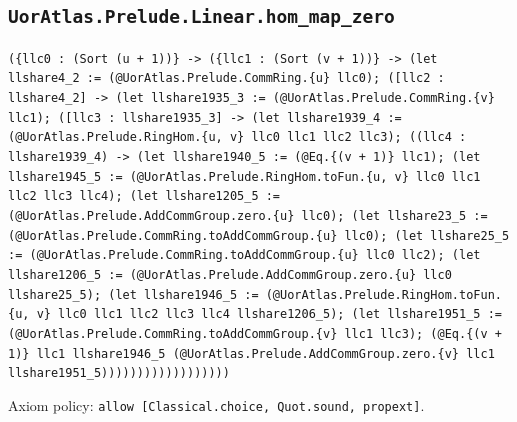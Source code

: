 \documentclass[11pt]{article}
\begin{document}
\subsection*{\texttt{UorAtlas.Prelude.Linear.hom\_map\_zero}}
\noindent\texttt{(\{llc0 : (Sort (u + 1))\} -> (\{llc1 : (Sort (v + 1))\} -> (let llshare4\_2 := (@UorAtlas.Prelude.CommRing.\{u\} llc0); ([llc2 : llshare4\_2] -> (let llshare1935\_3 := (@UorAtlas.Prelude.CommRing.\{v\} llc1); ([llc3 : llshare1935\_3] -> (let llshare1939\_4 := (@UorAtlas.Prelude.RingHom.\{u, v\} llc0 llc1 llc2 llc3); ((llc4 : llshare1939\_4) -> (let llshare1940\_5 := (@Eq.\{(v + 1)\} llc1); (let llshare1945\_5 := (@UorAtlas.Prelude.RingHom.toFun.\{u, v\} llc0 llc1 llc2 llc3 llc4); (let llshare1205\_5 := (@UorAtlas.Prelude.AddCommGroup.zero.\{u\} llc0); (let llshare23\_5 := (@UorAtlas.Prelude.CommRing.toAddCommGroup.\{u\} llc0); (let llshare25\_5 := (@UorAtlas.Prelude.CommRing.toAddCommGroup.\{u\} llc0 llc2); (let llshare1206\_5 := (@UorAtlas.Prelude.AddCommGroup.zero.\{u\} llc0 llshare25\_5); (let llshare1946\_5 := (@UorAtlas.Prelude.RingHom.toFun.\{u, v\} llc0 llc1 llc2 llc3 llc4 llshare1206\_5); (let llshare1951\_5 := (@UorAtlas.Prelude.CommRing.toAddCommGroup.\{v\} llc1 llc3); (@Eq.\{(v + 1)\} llc1 llshare1946\_5 (@UorAtlas.Prelude.AddCommGroup.zero.\{v\} llc1 llshare1951\_5))))))))))))))))))}\par
\noindent Axiom policy: \texttt{allow [Classical.choice, Quot.sound, propext]}.\par
\end{document}

